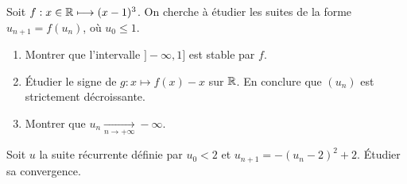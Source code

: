 \documentclass[../main.tex]{subfiles}
\begin{document}
\begin{exo}[D]
	Soit $f:x\in\mathbb R \longmapsto (x-1)^3$. On cherche à étudier les suites de la forme $u_{n+1}=f(u_n)$, où $u_0\leq 1$.\begin{enumerate}
		\item Montrer que l'intervalle $]-\infty,1]$ est stable par $f$.
		\item Étudier le signe de $g:x\longmapsto f(x)-x$ sur $\mathbb R$. En conclure que $(u_n)$ est strictement décroissante.
		\item Montrer que $u_n\xrightarrow[n\to+\infty]{}-\infty$.
	\end{enumerate}
\end{exo}

\begin{exo}[D]
	Soit $u$ la suite récurrente définie par $u_0<2$ et $u_{n+1} = -({u_n}-2)^2 + 2$. Étudier sa convergence.
\end{exo}
\end{document}
